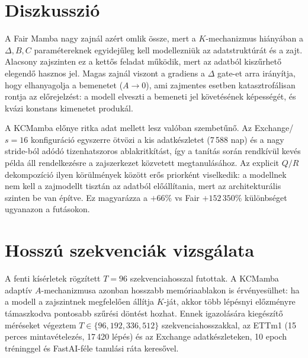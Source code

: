 \section{Diszkusszió}

A Fair Mamba nagy zajnál azért omlik össze, mert a $K$-mechanizmus hiányában
a $\Delta, B, C$ paramétereknek egyidejűleg kell modellezniük az
adatstruktúrát és a zajt. Alacsony zajszinten ez a kettős feladat
működik, mert az adatból kiszűrhető elegendő hasznos jel. Magas zajnál
viszont a gradiens a $\Delta$ gate-et arra irányítja, hogy elhanyagolja
a bemenetet ($A \to 0$), ami zajmentes esetben katasztrofálisan rontja
az előrejelzést: a modell elveszti a bemeneti jel követésének képességét,
és kvázi konstans kimenetet produkál.

A KCMamba előnye ritka adat mellett lesz valóban szembetűnő. Az Exchange/$s=16$
konfiguráció egyszerre ötvözi a kis adatkészletet (7\,588 nap) és a nagy
stride-ból adódó tizenhatszoros ablakritkítást, így a tanítás során rendkívül
kevés példa áll rendelkezésre a zajszerkezet közvetett megtanulásához.
Az explicit $Q/R$ dekompozíció ilyen körülmények között erős priorként
viselkedik: a modellnek nem kell a zajmodellt tisztán az adatból
előállítania, mert az architekturális szinten be van építve. Ez magyarázza
a $+66\%$ vs Fair $+152\,350\%$ különbséget ugyanazon a futásokon.

\section{Hosszú szekvenciák vizsgálata}
\label{sec:longseq}

A fenti kísérletek rögzített $T=96$ szekvenciahosszal futottak.
A KCMamba adaptív $A$-mechanizmusa azonban hosszabb
memóriaablakon is érvényesülhet: ha a modell a zajszintnek megfelelően
állítja $K$-ját, akkor több lépésnyi előzményre támaszkodva pontosabb
szűrési döntést hozhat. Ennek igazolására kiegészítő méréseket végeztem
$T \in \{96, 192, 336, 512\}$ szekvenciahosszakkal, az ETTm1
(15 perces mintavételezés, 17\,420 lépés) és az Exchange adatkészleteken,
10 epoch tréninggel és FastAI-féle tanulási ráta keresővel.

